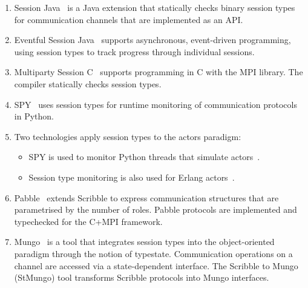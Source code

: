 \begin{enumerate}
	\item	Session Java~\cite{HU07TYPE-SAFE} is a Java extension
			that statically checks binary session types for communication channels
			that are implemented as an API.

	\item	Eventful Session Java~\cite{event} supports asynchronous, event-driven programming, using session types to track progress through individual sessions.

	\item	Multiparty Session C~\cite{NYH12} supports programming in C with the MPI library. The compiler statically checks session types.

	\item	SPY~\cite{DBLP:conf/rv/NeykovaYH13} uses session types for runtime monitoring of communication protocols in Python.

	\item	Two technologies apply session types to the actors paradigm:
			\begin{itemize}
				\item	SPY is used to monitor Python threads that simulate actors~\cite{DBLP:conf/coordination/NeykovaY14}.
				\item	Session type monitoring is also used for Erlang actors~\cite{SF15}.
			\end{itemize}

	\item	Pabble~\cite{DBLP:conf/pdp/NgY14} extends Scribble to express
			communication structures that are parametrised by the number of roles.
			Pabble protocols are implemented and typechecked for the C+MPI framework.

	\item	Mungo~\cite{mungo} is a tool that integrates session types into the object-oriented
			paradigm through the notion of typestate. Communication
			operations on a channel are accessed via a state-dependent interface.
			The Scribble to Mungo (StMungo) tool transforms Scribble
			protocols into Mungo interfaces.



\end{enumerate}
